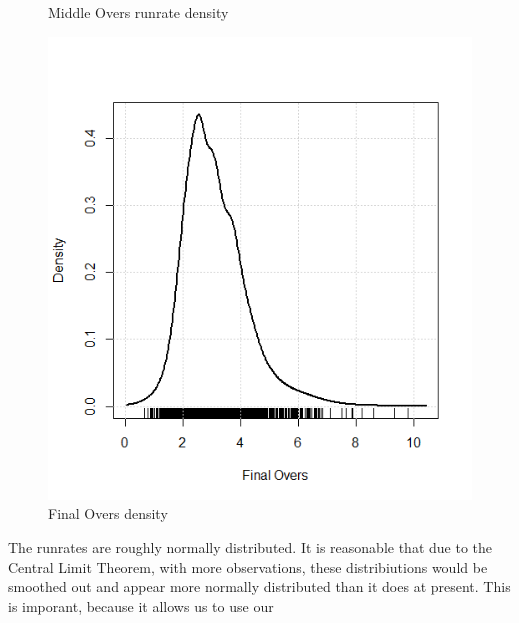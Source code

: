 \begin{figure}[h]
      \caption{Middle Overs runrate density}
    \endminipage\hfill
      \includegraphics[width=\linewidth]{figures/finaloversdens.png}
      \caption{Final Overs density}
    \endminipage
\end{figure}

The runrates are roughly normally distributed. It is reasonable that due to the Central Limit Theorem, with more observations, these distribiutions would be smoothed out and 
appear more normally distributed than it does at present. This is imporant, because it allows us to use our 